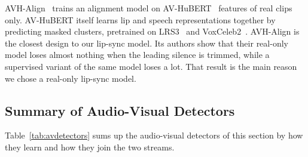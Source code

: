 AVH-Align~\cite{smeu2025} trains an alignment model on AV-HuBERT~\cite{avhubert}
features of real clips only. AV-HuBERT itself learns lip and speech
representations together by predicting masked clusters, pretrained on
LRS3~\cite{lrs3} and VoxCeleb2~\cite{voxceleb2}. AVH-Align is the closest
design to our lip-sync model. Its authors show that their real-only model
loses almost nothing when the leading silence is trimmed, while a supervised
variant of the same model loses a lot. That result is the main reason we chose
a real-only lip-sync model.

\subsection{Summary of Audio-Visual Detectors}

Table~\ref{tab:avdetectors} sums up the audio-visual detectors of this
section by how they learn and how they join the two streams.

